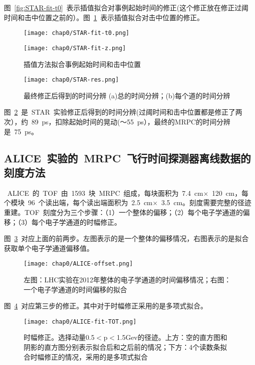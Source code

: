 图~\ref{fig:STAR-fit-t0}~表示插值拟合对事例起始时间的修正(这个修正放在修正过阈时间和击中位置之前的）。图~\ref{fig:STAR-fit-z}~表示插值拟合对击中位置的修正。
\begin{figure}[!h]
\begin{minipage}[!h]{0.48\linewidth}
\centering
\texttt{[image: chap0/STAR-fit-t0.png]}
\label{fig:STAR-fit-t0}
\end{minipage}
\begin{minipage}[!h]{0.48\linewidth}
\centering
\texttt{[image: chap0/STAR-fit-z.png]}
\label{fig:STAR-fit-z}
\end{minipage}%
\caption{插值方法拟合事例起始时间和击中位置}
\end{figure}


\begin{figure}[!h]
  \centering
  \texttt{[image: chap0/STAR-res.png]}
  \caption{最终修正后得到的时间分辨 (a)总的时间分辨；(b)每个道的时间分辨}
  \label{fig:STAR-res}
\end{figure}

图~\ref{fig:STAR-res}~是~STAR~实验修正后得到的时间分辨(过阈时间和击中位置都是修正了两次），约~89~ps，扣除起始时间的晃动(～55~ps），最终的MRPC的时间分辨是~75~ps。


\subsection{ALICE~实验的~MRPC~飞行时间探测器离线数据的刻度方法}
~ALICE~的~TOF~由~1593~块~MRPC~组成，每块面积为~7.4~cm$\times$~120~cm，每个模块~96~个读出端，每个读出端面积为~2.5~cm$\times$~3.5~cm。刻度需要完整的径迹重建。TOF~刻度分为三个步骤：（1）一个整体的偏移；（2）每个电子学通道的偏移；（3）每个电子学通道的时幅修正。

图~\ref{fig:ALICE-offset}~对应上面的前两步。左图表示的是一个整体的偏移情况，右图表示的是拟合获取单个电子学通道偏移值。
\begin{figure}[!h]
  \centering
  \texttt{[image: chap0/ALICE-offset.png]}
  \caption{左图：LHC实验在2012年整体的电子学通道的时间偏移情况；右图：一个电子学通道的时间偏移的拟合}
  \label{fig:ALICE-offset}
\end{figure}

图~\ref{fig:ALICE-fit-TOT}~对应第三步的修正。其中对于时幅修正采用的是多项式拟合。
\begin{figure}[!h]
  \centering
  \texttt{[image: chap0/ALICE-fit-TOT.png]}
  \caption{时幅修正。选择动量0.5$<$p$<$1.5Gev的径迹。上方：空的直方图和阴影的直方图分别表示拟合后和之后前的情况；下方：4个读数条拟合时幅修正的情况，采用的是多项式拟合}
  \label{fig:ALICE-fit-TOT}
\end{figure}

